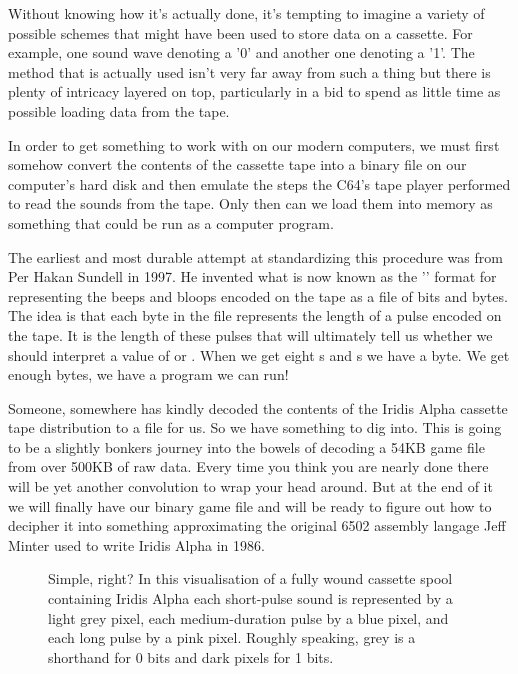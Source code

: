 Without knowing how it's actually done, it's tempting to imagine a variety of possible schemes that
might have been used to store data on a cassette. For example, one sound wave denoting a '0' and another one denoting a '1'.
The method that is actually used isn't very far away from such a thing but there is plenty of intricacy
layered on top, particularly in a bid to spend as little time as possible loading data from the
tape.

In order to get something to work with on our modern computers, we must first somehow convert the contents of the
cassette tape into a binary file on our computer's hard disk and then emulate the steps the C64's tape player performed
to read the sounds from the tape. Only then can we load them into memory as something that could be run as a
computer program.

The earliest and most durable attempt at standardizing this procedure was from Per Hakan Sundell in 1997. He
invented what is now known as the '' format for representing the beeps and bloops encoded on the
tape as a file of bits and bytes. The idea is that each byte in the  file represents the length of
a pulse encoded on the tape. It is the length of these pulses that will ultimately tell us whether we should interpret
a value of  or . When we get eight s and s we have a byte. We get enough bytes, we have a program
we can run!

Someone, somewhere has kindly decoded the contents of the Iridis Alpha cassette tape distribution to
a  file for us. So we have something to dig into. This is going to be a slightly bonkers journey
into the bowels of decoding a 54KB game file from over 500KB of raw data. Every time you think you
are nearly done there will be yet another convolution to wrap your head around. But at the end of it
we will finally have our binary game file and will be ready to figure out how to decipher it into something
approximating the original 6502 assembly langage Jeff Minter used to write Iridis Alpha in 1986.

\begin{figure}[H]
  {
    \begin{adjustbox}{width=10cm,center}
    \end{adjustbox}
  }\caption[]{Simple, right? In this visualisation of a fully wound cassette spool containing Iridis Alpha each short-pulse sound is represented by a light grey pixel, each medium-duration pulse by a blue pixel,
and each long pulse by a pink pixel. Roughly speaking, grey is a shorthand for 0 bits and dark pixels for 1 bits.}
\end{figure}

